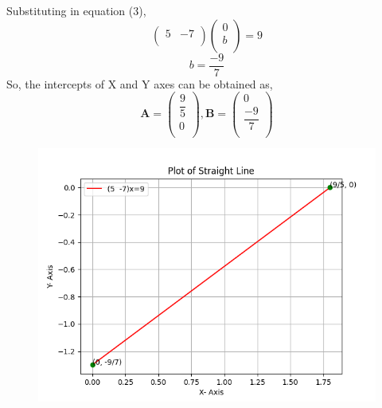 \documentclass[twocolumn]{article}
\begin{document}
Substituting in equation (3),
\begin{equation}
\begin{pmatrix}
5 & -7 \\ 
\end{pmatrix}\begin{pmatrix}
0\\ 
b\\
\end{pmatrix} = 9
\end{equation}
\begin{equation}
b = \frac{-9}{7}
\end{equation}
So, the intercepts of X and Y axes can be obtained as,
\begin{equation}
\textbf{A} = \begin{pmatrix}
\dfrac{9}{5}\\ 
0\\
\end{pmatrix} , 
\textbf{B} = \begin{pmatrix}
0\\
\dfrac{-9}{7}\\ 
\end{pmatrix}
\end{equation}

\begin{figure}[!ht]
\includegraphics[width=1.1\columnwidth]{Figure_1.png}
\label{fig}
\end{figure}
\end{document}
